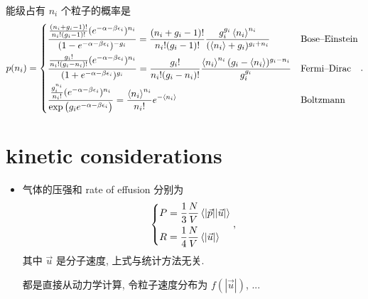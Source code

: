 \begin{itemize}
	\begin{tcolorbox}[title=calculation:]
		能级占有 $n_i$ 个粒子的概率是
		\begin{equation}
			p(n_i) = \begin{dcases}
				\frac{\frac{(n_i + g_i - 1)!}{n_i! (g_i - 1)!} (e^{- \alpha - \beta \epsilon_i})^{n_i}}{(1 - e^{- \alpha - \beta \epsilon_i})^{- g_i}} = \frac{(n_i + g_i - 1)!}{n_i! (g_i - 1)!} \frac{g_i^{g_i} \braket{n_i}^{n_i}}{(\braket{n_i} + g_i)^{g_i + n_i}} & \text{Bose--Einstein} \\
				\frac{\frac{g_i!}{n_i! (g_i - n_i)!} (e^{- \alpha - \beta \epsilon_i})^{n_i}}{(1 + e^{- \alpha - \beta \epsilon_i})^{g_i}} = \frac{g_i!}{n_i! (g_i - n_i)!} \frac{\braket{n_i}^{n_i} (g_i - \braket{n_i})^{g_i - n_i}}{g_i^{g_i}} & \text{Fermi--Dirac} \\
				\frac{\frac{g_i^{n_i}}{n_i!} (e^{- \alpha - \beta \epsilon_i})^{n_i}}{\exp \big( g_i e^{- \alpha - \beta \epsilon_i} \big)} = \frac{\braket{n_i}^{n_i}}{n_i!} e^{- \braket{n_i}} & \text{Boltzmann}
			\end{dcases}.
		\end{equation}
	\end{tcolorbox}
\end{itemize}

\section{kinetic considerations}
\begin{itemize}
	\item 气体的压强和 rate of effusion 分别为
	\begin{equation}
		\begin{dcases}
			P = \frac{1}{3} \frac{N}{V} \braket{|\vec{p}| |\vec{u}|} \\
			R = \frac{1}{4} \frac{N}{V} \braket{|\vec{u}|}
		\end{dcases},
	\end{equation}
	其中 $\vec{u}$ 是分子速度, 上式与统计方法无关.
	
	\begin{tcolorbox}[title=calculation:]
		都是直接从动力学计算, 令粒子速度分布为 $f(|\vec{u}|)$, ...
	\end{tcolorbox}
\end{itemize}


